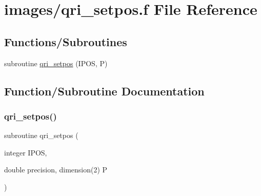 \hypertarget{qri__setpos_8f}{}\section{images/qri\+\_\+setpos.f File Reference}
\label{qri__setpos_8f}
\subsection*{Functions/\+Subroutines}
\begin{DoxyCompactItemize}
\item 
subroutine \hyperlink{qri__setpos_8f_abaa67ac63c9dab4c1b1f5710b4435b0f}{qri\+\_\+setpos} (I\+P\+OS, P)
\end{DoxyCompactItemize}


\subsection{Function/\+Subroutine Documentation}
\mbox{\label{qri__setpos_8f_abaa67ac63c9dab4c1b1f5710b4435b0f}} 
\subsubsection{\texorpdfstring{qri\+\_\+setpos()}{qri\_setpos()}}
{\footnotesize\ttfamily subroutine qri\+\_\+setpos (\begin{DoxyParamCaption}\item[{integer}]{I\+P\+OS,  }\item[{double precision, dimension(2)}]{P }\end{DoxyParamCaption})}


